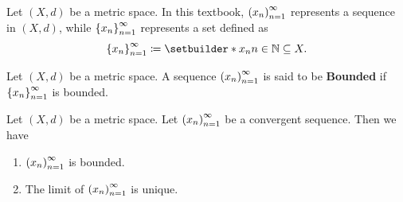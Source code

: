 \bigskip

\begin{remark}
    Let $(X, d)$ be a metric space. In this textbook, $\paren*{x_{n}}_{n = 1}^{\infty}$ represents
    a sequence in $(X, d)$, while $\set*{x_{n}}_{n = 1}^{\infty}$ represents a set defined as
    \[
    \set*{x_{n}}_{n = 1}^{\infty} \coloneqq \setbuilder*{x_{n}}{n \in \N} \subseteq X.
    \]
\end{remark}

\bigskip

\begin{definition} \label{an:def:bounded-sequence}
    Let $(X, d)$ be a metric space. A sequence $\paren*{x_{n}}_{n = 1}^{\infty}$
    is said to be \textbf{Bounded} if $\set*{x_{n}}_{n = 1}^{\infty}$ is bounded.
\end{definition}

\bigskip

\begin{theorem} \label{an:thm:convergent-sequence-is-bounded}
    Let $(X, d)$ be a metric space. Let $\paren*{x_{n}}_{n = 1}^{\infty}$ be a convergent sequence. Then we have
    \begin{enumerate}[label=\textbf{(\Alph*)}]
        \item $\paren*{x_{n}}_{n = 1}^{\infty}$ is bounded.
        \item The limit of $\paren*{x_{n}}_{n = 1}^{\infty}$ is unique.
    \end{enumerate}
\end{theorem}

